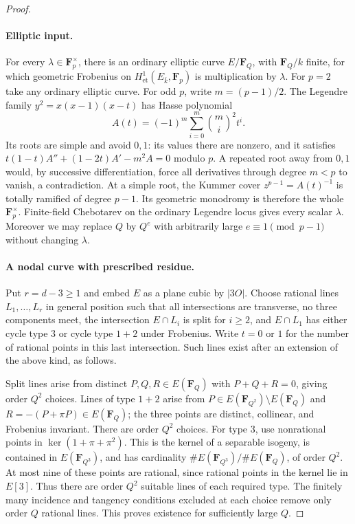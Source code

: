 \begin{proof}

\paragraph{Elliptic input.}
For every $\lambda\in\mathbf F_p^\times$, there is an ordinary elliptic
curve $E/\mathbf F_Q$, with $\mathbf F_Q/k$ finite, for which geometric
Frobenius on $H^1_{\mathrm{et}}(E_{\bar k},\mathbf F_p)$ is multiplication
by $\lambda$.  For $p=2$ take any ordinary elliptic curve.  For odd $p$,
write $m=(p-1)/2$.  The Legendre family
$y^2=x(x-1)(x-t)$ has Hasse polynomial
\[
 A(t)=(-1)^m\sum_{i=0}^{m}\binom mi^2t^i.
\]
Its roots are simple and avoid $0,1$: its values there are nonzero,
and it satisfies
$t(1-t)A''+(1-2t)A'-m^2A=0$ modulo $p$.
A repeated root away from $0,1$ would, by successive differentiation,
force all derivatives through degree $m<p$ to vanish, a contradiction.
At a simple root, the Kummer cover $z^{p-1}=A(t)^{-1}$ is totally
ramified of degree $p-1$.  Its geometric monodromy is therefore the
whole $\mathbf F_p^\times$.  Finite-field Chebotarev on the ordinary
Legendre locus gives every scalar $\lambda$.
Moreover we may replace $Q$ by $Q^e$ with arbitrarily large
$e\equiv1\pmod{p-1}$ without changing $\lambda$.

\paragraph{A nodal curve with prescribed residue.}
Put $r=d-3\geq1$ and embed $E$ as a plane cubic by $|3O|$.
Choose rational lines $L_1,\ldots,L_r$ in general position such that
all intersections are transverse, no three components meet, the
intersection $E\cap L_i$ is split for $i\geq2$, and
$E\cap L_1$ has either cycle type $3$ or cycle type $1+2$ under
Frobenius.  Write $t=0$ or $1$ for the number of rational points in
this last intersection.  Such lines exist after an extension of the
above kind, as follows.

Split lines arise from distinct $P,Q,R\in E(\mathbf F_Q)$ with
$P+Q+R=0$, giving order $Q^2$ choices.  Lines of type $1+2$ arise from
$P\in E(\mathbf F_{Q^2})\setminus E(\mathbf F_Q)$ and
$R=-(P+\pi P)\in E(\mathbf F_Q)$; the three points are distinct,
collinear, and Frobenius invariant.  There are order $Q^2$ choices.
For type $3$, use nonrational points in
$\ker(1+\pi+\pi^2)$.  This is the kernel of a separable isogeny,
is contained in $E(\mathbf F_{Q^3})$, and has cardinality
$\#E(\mathbf F_{Q^3})/\#E(\mathbf F_Q)$, of order $Q^2$.
At most nine of these points are rational, since rational points in
the kernel lie in $E[3]$.  Thus there are order $Q^2$ suitable lines
of each required type.  The finitely many incidence and tangency
conditions excluded at each choice remove only order $Q$ rational
lines.  This proves existence for sufficiently large $Q$.


\end{proof}
